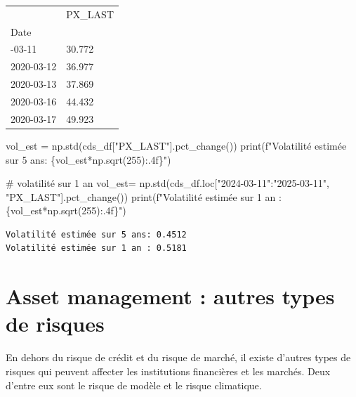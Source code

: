 \documentclass[
  letterpaper,
  DIV=11,
  numbers=noendperiod]{scrartcl}
\newenvironment{Shaded}{\begin{snugshade}}{\end{snugshade}}
\newcommand{\BuiltInTok}[1]{\textcolor[rgb]{0.00,0.23,0.31}{#1}}
\newcommand{\CommentTok}[1]{\textcolor[rgb]{0.37,0.37,0.37}{#1}}
\newcommand{\DecValTok}[1]{\textcolor[rgb]{0.68,0.00,0.00}{#1}}
\newcommand{\NormalTok}[1]{\textcolor[rgb]{0.00,0.23,0.31}{#1}}
\newcommand{\OperatorTok}[1]{\textcolor[rgb]{0.37,0.37,0.37}{#1}}
\newcommand{\SpecialCharTok}[1]{\textcolor[rgb]{0.37,0.37,0.37}{#1}}
\newcommand{\SpecialStringTok}[1]{\textcolor[rgb]{0.13,0.47,0.30}{#1}}
\newcommand{\StringTok}[1]{\textcolor[rgb]{0.13,0.47,0.30}{#1}}
\begin{document}
\begin{longtable}[]{@{}ll@{}}
\toprule\noalign{}
& PX\_LAST \\
Date & \\
\midrule\noalign{}
\endhead
\bottomrule\noalign{}
\endlastfoot
2020-03-11 & 30.772 \\
2020-03-12 & 36.977 \\
2020-03-13 & 37.869 \\
2020-03-16 & 44.432 \\
2020-03-17 & 49.923 \\
\end{longtable}

\begin{Shaded}
\begin{Highlighting}[]
\NormalTok{vol\_est }\OperatorTok{=}\NormalTok{ np.std(cds\_df[}\StringTok{"PX\_LAST"}\NormalTok{].pct\_change())}
\BuiltInTok{print}\NormalTok{(}\SpecialStringTok{f"Volatilité estimée sur 5 ans: }\SpecialCharTok{\{}\NormalTok{vol\_est}\OperatorTok{*}\NormalTok{np}\SpecialCharTok{.}\NormalTok{sqrt(}\DecValTok{255}\NormalTok{)}\SpecialCharTok{:.4f\}}\SpecialStringTok{"}\NormalTok{)}

\CommentTok{\# volatilité sur 1 an}
\NormalTok{vol\_est}\OperatorTok{=}\NormalTok{ np.std(cds\_df.loc[}\StringTok{"2024{-}03{-}11"}\NormalTok{:}\StringTok{"2025{-}03{-}11"}\NormalTok{, }\StringTok{"PX\_LAST"}\NormalTok{].pct\_change())}
\BuiltInTok{print}\NormalTok{(}\SpecialStringTok{f"Volatilité estimée sur 1 an : }\SpecialCharTok{\{}\NormalTok{vol\_est}\OperatorTok{*}\NormalTok{np}\SpecialCharTok{.}\NormalTok{sqrt(}\DecValTok{255}\NormalTok{)}\SpecialCharTok{:.4f\}}\SpecialStringTok{"}\NormalTok{)}
\end{Highlighting}
\end{Shaded}

\begin{verbatim}
Volatilité estimée sur 5 ans: 0.4512
Volatilité estimée sur 1 an : 0.5181
\end{verbatim}

\section{Asset management : autres types de
risques}\label{asset-management-autres-types-de-risques}

En dehors du risque de crédit et du risque de marché, il existe d'autres
types de risques qui peuvent affecter les institutions financières et
les marchés. Deux d'entre eux sont le risque de modèle et le risque
climatique.
\end{document}
